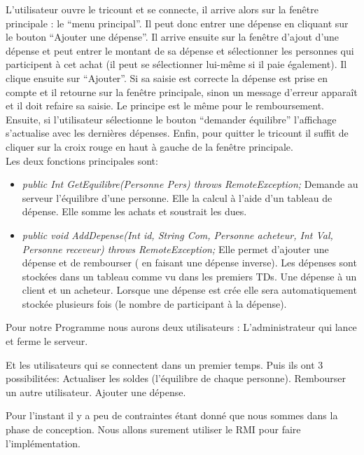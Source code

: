 \documentclass[12,french]{report}
\begin{document}
L’utilisateur ouvre le tricount et se connecte, il arrive alors sur la fenêtre principale : le “menu principal”. Il peut donc entrer une dépense en cliquant sur le bouton “Ajouter une dépense”. Il arrive ensuite sur la fenêtre d’ajout d’une dépense et peut entrer le montant de sa dépense et sélectionner les personnes qui participent à cet achat (il peut se sélectionner lui-même si il paie également). Il clique ensuite sur “Ajouter”. Si sa saisie est correcte la dépense est prise en compte et il retourne sur la fenêtre principale, sinon un message d’erreur apparaît et il doit refaire sa saisie.
Le principe est le même pour le remboursement.
Ensuite, si l’utilisateur sélectionne le bouton “demander équilibre” l’affichage s’actualise avec les dernières dépenses.
Enfin, pour quitter le tricount il suffit de cliquer sur la croix rouge en haut à gauche de la fenêtre principale.\\

Les deux fonctions principales sont:\\

\begin{itemize}[label=\textbullet]
	\item \textit{public Int GetEquilibre(Personne Pers) throws RemoteException;}
Demande au serveur l’équilibre d’une personne. Elle la calcul à l’aide d’un tableau de dépense. Elle somme les achats et soustrait les dues.
	\item \textit{public void AddDepense(Int id, String Com, Personne acheteur, Int Val, Personne receveur) throws RemoteException;}
Elle permet d’ajouter une dépense et de rembourser ( en faisant une dépense inverse). Les dépenses sont stockées dans un tableau comme vu dans les premiers TDs. Une dépense à un client et un acheteur. Lorsque une dépense est crée elle sera automatiquement stockée plusieurs fois (le nombre de participant à la dépense).
\end{itemize}\vspace{0.5cm}

Pour notre Programme nous aurons deux utilisateurs :
L’administrateur qui lance et ferme le serveur.

Et les utilisateurs qui se connectent dans un premier temps. Puis ils ont 3 possibilitées:
Actualiser les soldes (l’équilibre de chaque personne).
Rembourser un autre utilisateur.
Ajouter une dépense.

Pour l’instant il y a peu de contraintes étant donné que nous sommes dans la phase de conception. Nous allons surement utiliser le RMI pour faire l'implémentation. 
\end{document}
